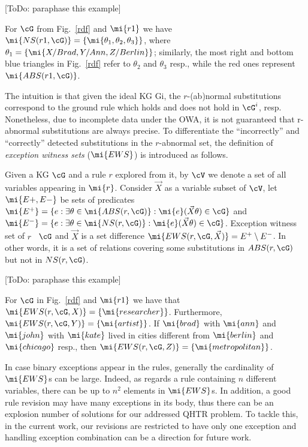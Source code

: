 [ToDo: paraphase this example]
\begin{example}\label{ex:abns}
For $\cG$ from Fig.~\ref{rdf} and $\mi{r1}$ %
we have
$\mi{NS(r1,\cG)}=\{\mi{\theta_1,\theta_2,\theta_3}\}$, where $\theta_1=\{\mi{X/Brad,Y/Ann,Z/Berlin}\}$; similarly, the most right and bottom blue triangles in Fig.~\ref{rdf} refer to $\theta_2$ and $\theta_3$ resp., while the red ones represent $\mi{ABS(r1,\cG)}$.
\end{example}

The intuition is that given the ideal KG Gi, the $r$-(ab)normal substitutions correspond to the ground rule which holds and does not hold in $\cG^i$, resp. Nonetheless, due to incomplete data under the OWA, it is not guaranteed that r-abnormal substitutions are always precise. To differentiate the ``incorrectly'' and ``correctly'' detected substitutions in the $r$-abnormal set, the definition of \emph{exception witness sets} ($\mi{EWS}$) is introduced as follows.

\begin{definition} \label{def:ews}
Given a KG $\cG$ and a rule $r$ explored from it, by $\cV$ we denote a set of all variables appearing in $\mi{r}$. Consider $\vec{X}$ as a variable subset of $\cV$, let $\mi{E+, E-}$ be sets of predicates $\mi{E^+}=\{e: \exists \theta \in \mi{ABS(r,\cG)}: \mi{e}(\vec{X}\theta)\in \cG\}$ and $\mi{E^-}=\{e: \exists \theta \in \mi{NS(r,\cG)}: \mi{e}(\vec{X}\theta)\in \cG\}$. Exception witness set of $r$ \wrt\ $\cG$ and $\vec{X}$ is a set difference $\mi{EWS(r,\cG,\vec{X})}=E^+ \setminus E^-$. In other words, it is a set of relations covering some substitutions in $ABS(r, \cG)$ but not in $NS(r, \cG)$.
\end{definition}

[ToDo: paraphase this example]
\begin{example}
For $\cG$ in Fig.~\ref{rdf} and $\mi{r1}$ %
we have that $\mi{EWS(r,\cG,X)}=\{\mi{researcher}\}$. Furthermore,
 $\mi{EWS(r,\cG,Y)}=\{\mi{artist}\}$. If $\mi{brad}$ with $\mi{ann}$ and $\mi{john}$ with $\mi{kate}$ lived in cities different from $\mi{berlin}$ and $\mi{chicago}$ resp., then $\mi{EWS(r,\cG,Z)}=\{\mi{metropolitan}\}$. 
\end{example}

In case binary exceptions appear in the rules, generally the cardinality of $\mi{EWS}$s can be large. Indeed, as regards a rule containing $n$ different variables, there can be up to $n^2$ elements in $\mi{EWS}$s. In addition, a good rule revision may have many exceptions in its body, thus there can be an explosion number of solutions for our addressed QHTR problem. To tackle this, in the current work, our revisions are restricted to have only one exception and handling exception combination can be a direction for future work.


